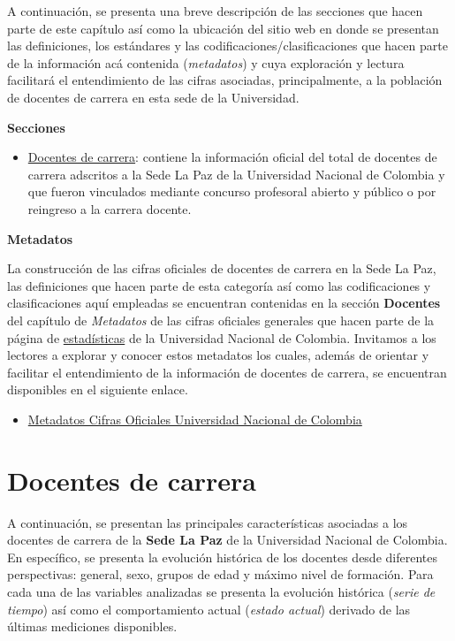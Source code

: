 \documentclass[
]{book}
\providecommand{\tightlist}{%
  \setlength{\itemsep}{0pt}\setlength{\parskip}{0pt}}
\begin{document}
A continuación, se presenta una breve descripción de las secciones que hacen parte de este capítulo así como la ubicación del sitio web en donde se presentan las definiciones, los estándares y las codificaciones/clasificaciones que hacen parte de la información acá contenida (\emph{metadatos}) y cuya exploración y lectura facilitará el entendimiento de las cifras asociadas, principalmente, a la población de docentes de carrera en esta sede de la Universidad.

\textbf{Secciones}

\begin{itemize}
\tightlist
\item
  \protect\hyperlink{DocCar}{Docentes de carrera}: contiene la información oficial del total de docentes de carrera adscritos a la Sede La Paz de la Universidad Nacional de Colombia y que fueron vinculados mediante concurso profesoral abierto y público o por reingreso a la carrera docente.
\end{itemize}

\textbf{Metadatos}

La construcción de las cifras oficiales de docentes de carrera en la Sede La Paz, las definiciones que hacen parte de esta categoría así como las codificaciones y clasificaciones aquí empleadas se encuentran contenidas en la sección \textbf{Docentes} del capítulo de \emph{Metadatos} de las cifras oficiales generales que hacen parte de la página de \href{http://estadisticas.unal.edu.co/home/}{estadísticas} de la Universidad Nacional de Colombia. Invitamos a los lectores a explorar y conocer estos metadatos los cuales, además de orientar y facilitar el entendimiento de la información de docentes de carrera, se encuentran disponibles en el siguiente enlace.

\begin{itemize}
\tightlist
\item
  \href{http://estadisticas.unal.edu.co/menu-principal/cifras-generales/metadatos/cifras-generales/}{Metadatos Cifras Oficiales Universidad Nacional de Colombia}
\end{itemize}

\hypertarget{DocCar}{%
\section{Docentes de carrera}\label{DocCar}}

A continuación, se presentan las principales características asociadas a los docentes de carrera de la \textbf{Sede La Paz} de la Universidad Nacional de Colombia. En específico, se presenta la evolución histórica de los docentes desde diferentes perspectivas: general, sexo, grupos de edad y máximo nivel de formación. Para cada una de las variables analizadas se presenta la evolución histórica (\emph{serie de tiempo}) así como el comportamiento actual (\emph{estado actual}) derivado de las últimas mediciones disponibles.
\end{document}

